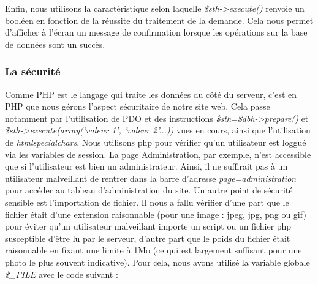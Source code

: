 \documentclass[titlepage,11pt,a4paper]{article}
\begin{document}
Enfin, nous utilisons la caractéristique selon laquelle \emph{\$sth->execute()} renvoie un booléen en fonction de la réussite du traitement de la demande. Cela nous permet d'afficher à l'écran un message de confirmation lorsque les opérations sur la base de données sont un succès.



\subsubsection{La sécurité}

Comme PHP est le langage qui traite les données du côté du serveur, c'est en PHP que nous gérons l'aspect sécuritaire de notre site web. Cela passe notamment par l'utilisation de PDO et des instructions \emph{\$sth=\$dbh->prepare()} et \emph{\$sth->execute(array('valeur 1', 'valeur 2'...))} vues en cours, ainsi que l'utilisation de \emph{htmlspecialchars}. Nous utilisons php pour vérifier qu'un utilisateur est loggué via les variables de session. La page Administration, par exemple, n'est accessible que si l'utilisateur est bien un administrateur. Ainsi, il ne suffirait pas à un utilisateur malveillant de rentrer dans la barre d'adresse \emph{page=administration} pour accéder au tableau d'administration du site. Un autre point de sécurité sensible est l'importation de fichier. Il nous a fallu vérifier d'une part que le fichier était d'une extension raisonnable (pour une image : jpeg, jpg, png ou gif) pour éviter qu'un utilisateur malveillant importe un script ou un fichier php susceptible d'être lu par le serveur, d'autre part que le poids du fichier était raisonnable en fixant une limite à 1Mo (ce qui est largement suffisant pour une photo le plus souvent indicative). Pour cela, nous avons utilisé la variable globale \emph{\$\_FILE} avec le code suivant :
\end{document}
